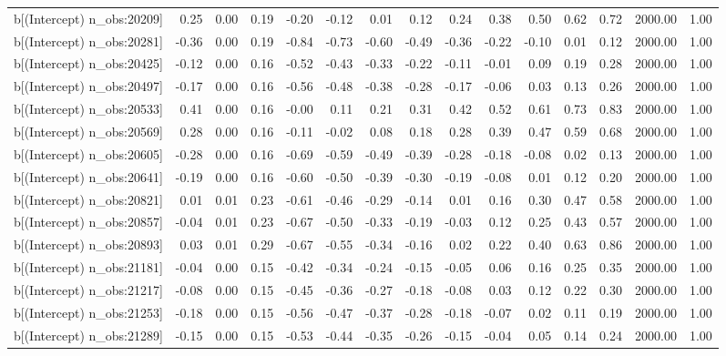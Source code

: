 \begin{table}[ht]
\begin{tabular}{rrrrrrrrrrrrrrr}
  b[(Intercept) n\_obs:20209] & 0.25 & 0.00 & 0.19 & -0.20 & -0.12 & 0.01 & 0.12 & 0.24 & 0.38 & 0.50 & 0.62 & 0.72 & 2000.00 & 1.00 \\ 
  b[(Intercept) n\_obs:20281] & -0.36 & 0.00 & 0.19 & -0.84 & -0.73 & -0.60 & -0.49 & -0.36 & -0.22 & -0.10 & 0.01 & 0.12 & 2000.00 & 1.00 \\ 
  b[(Intercept) n\_obs:20425] & -0.12 & 0.00 & 0.16 & -0.52 & -0.43 & -0.33 & -0.22 & -0.11 & -0.01 & 0.09 & 0.19 & 0.28 & 2000.00 & 1.00 \\ 
  b[(Intercept) n\_obs:20497] & -0.17 & 0.00 & 0.16 & -0.56 & -0.48 & -0.38 & -0.28 & -0.17 & -0.06 & 0.03 & 0.13 & 0.26 & 2000.00 & 1.00 \\ 
  b[(Intercept) n\_obs:20533] & 0.41 & 0.00 & 0.16 & -0.00 & 0.11 & 0.21 & 0.31 & 0.42 & 0.52 & 0.61 & 0.73 & 0.83 & 2000.00 & 1.00 \\ 
  b[(Intercept) n\_obs:20569] & 0.28 & 0.00 & 0.16 & -0.11 & -0.02 & 0.08 & 0.18 & 0.28 & 0.39 & 0.47 & 0.59 & 0.68 & 2000.00 & 1.00 \\ 
  b[(Intercept) n\_obs:20605] & -0.28 & 0.00 & 0.16 & -0.69 & -0.59 & -0.49 & -0.39 & -0.28 & -0.18 & -0.08 & 0.02 & 0.13 & 2000.00 & 1.00 \\ 
  b[(Intercept) n\_obs:20641] & -0.19 & 0.00 & 0.16 & -0.60 & -0.50 & -0.39 & -0.30 & -0.19 & -0.08 & 0.01 & 0.12 & 0.20 & 2000.00 & 1.00 \\ 
  b[(Intercept) n\_obs:20821] & 0.01 & 0.01 & 0.23 & -0.61 & -0.46 & -0.29 & -0.14 & 0.01 & 0.16 & 0.30 & 0.47 & 0.58 & 2000.00 & 1.00 \\ 
  b[(Intercept) n\_obs:20857] & -0.04 & 0.01 & 0.23 & -0.67 & -0.50 & -0.33 & -0.19 & -0.03 & 0.12 & 0.25 & 0.43 & 0.57 & 2000.00 & 1.00 \\ 
  b[(Intercept) n\_obs:20893] & 0.03 & 0.01 & 0.29 & -0.67 & -0.55 & -0.34 & -0.16 & 0.02 & 0.22 & 0.40 & 0.63 & 0.86 & 2000.00 & 1.00 \\ 
  b[(Intercept) n\_obs:21181] & -0.04 & 0.00 & 0.15 & -0.42 & -0.34 & -0.24 & -0.15 & -0.05 & 0.06 & 0.16 & 0.25 & 0.35 & 2000.00 & 1.00 \\ 
  b[(Intercept) n\_obs:21217] & -0.08 & 0.00 & 0.15 & -0.45 & -0.36 & -0.27 & -0.18 & -0.08 & 0.03 & 0.12 & 0.22 & 0.30 & 2000.00 & 1.00 \\ 
  b[(Intercept) n\_obs:21253] & -0.18 & 0.00 & 0.15 & -0.56 & -0.47 & -0.37 & -0.28 & -0.18 & -0.07 & 0.02 & 0.11 & 0.19 & 2000.00 & 1.00 \\ 
  b[(Intercept) n\_obs:21289] & -0.15 & 0.00 & 0.15 & -0.53 & -0.44 & -0.35 & -0.26 & -0.15 & -0.04 & 0.05 & 0.14 & 0.24 & 2000.00 & 1.00 \\ 

\end{tabular}
\end{table}
